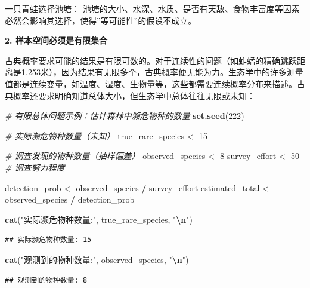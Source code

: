 \documentclass[
]{book}
\newenvironment{Shaded}{\begin{snugshade}}{\end{snugshade}}
\newcommand{\CommentTok}[1]{\textcolor[rgb]{0.56,0.35,0.01}{\textit{#1}}}
\newcommand{\DecValTok}[1]{\textcolor[rgb]{0.00,0.00,0.81}{#1}}
\newcommand{\FunctionTok}[1]{\textcolor[rgb]{0.13,0.29,0.53}{\textbf{#1}}}
\newcommand{\NormalTok}[1]{#1}
\newcommand{\OtherTok}[1]{\textcolor[rgb]{0.56,0.35,0.01}{#1}}
\newcommand{\SpecialCharTok}[1]{\textcolor[rgb]{0.81,0.36,0.00}{\textbf{#1}}}
\newcommand{\StringTok}[1]{\textcolor[rgb]{0.31,0.60,0.02}{#1}}
\begin{document}
一只青蛙选择池塘： 池塘的大小、水深、水质、是否有天敌、食物丰富度等因素必然会影响其选择，使得''等可能性''的假设不成立。

\textbf{2. 样本空间必须是有限集合}

古典概率要求可能的结果是有限可数的。对于连续性的问题（如蚱蜢的精确跳跃距离是1.253米），因为结果有无限多个，古典概率便无能为力。生态学中的许多测量值都是连续变量，如温度、湿度、生物量等，这些都需要连续概率分布来描述。古典概率还要求明确知道总体大小，但生态学中总体往往无限或未知：

\begin{Shaded}
\begin{Highlighting}[]
\CommentTok{\# 有限总体问题示例：估计森林中濒危物种的数量}
\FunctionTok{set.seed}\NormalTok{(}\DecValTok{222}\NormalTok{)}

\CommentTok{\# 实际濒危物种数量（未知）}
\NormalTok{true\_rare\_species }\OtherTok{\textless{}{-}} \DecValTok{15}

\CommentTok{\# 调查发现的物种数量（抽样偏差）}
\NormalTok{observed\_species }\OtherTok{\textless{}{-}} \DecValTok{8}
\NormalTok{survey\_effort }\OtherTok{\textless{}{-}} \DecValTok{50}  \CommentTok{\# 调查努力程度}

\NormalTok{detection\_prob }\OtherTok{\textless{}{-}}\NormalTok{ observed\_species }\SpecialCharTok{/}\NormalTok{ survey\_effort}
\NormalTok{estimated\_total }\OtherTok{\textless{}{-}}\NormalTok{ observed\_species }\SpecialCharTok{/}\NormalTok{ detection\_prob}

\FunctionTok{cat}\NormalTok{(}\StringTok{"实际濒危物种数量:"}\NormalTok{, true\_rare\_species, }\StringTok{"}\SpecialCharTok{\textbackslash{}n}\StringTok{"}\NormalTok{)}
\end{Highlighting}
\end{Shaded}

\begin{verbatim}
## 实际濒危物种数量: 15
\end{verbatim}

\begin{Shaded}
\begin{Highlighting}[]
\FunctionTok{cat}\NormalTok{(}\StringTok{"观测到的物种数量:"}\NormalTok{, observed\_species, }\StringTok{"}\SpecialCharTok{\textbackslash{}n}\StringTok{"}\NormalTok{)}
\end{Highlighting}
\end{Shaded}

\begin{verbatim}
## 观测到的物种数量: 8
\end{verbatim}
\end{document}

